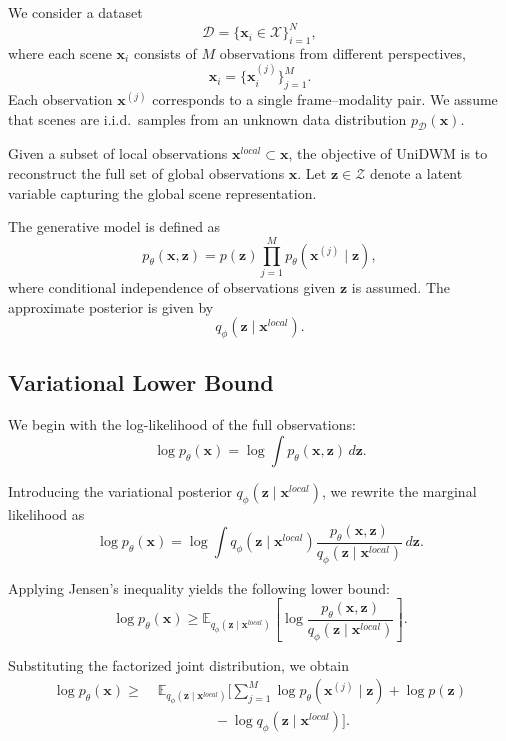 \documentclass{article}
\theoremstyle{plain}
\theoremstyle{definition}
\theoremstyle{remark}
\begin{document}
We consider a dataset
\[
\mathcal{D} = \{ \mathbf{x}_i \in \mathcal{X} \}_{i=1}^{N},
\]
where each scene $\mathbf{x}_i$ consists of $M$ observations from different perspectives,
\[
\mathbf{x}_i = \{ \boldsymbol{x}_i^{(j)} \}_{j=1}^{M}.
\]
Each observation $\boldsymbol{x}^{(j)}$ corresponds to a single frame--modality pair.
We assume that scenes are i.i.d.\ samples from an unknown data distribution
$p_{\mathcal{D}}(\mathbf{x})$.

Given a subset of local observations $\mathbf{x}^{local} \subset \mathbf{x}$,
the objective of UniDWM is to reconstruct the full set of global observations
$\mathbf{x}$.
Let $\mathbf{z} \in \mathcal{Z}$ denote a latent variable capturing the global
scene representation.

The generative model is defined as
\[
p_\theta(\mathbf{x}, \mathbf{z})
= p(\mathbf{z}) \prod_{j=1}^{M} p_\theta(\boldsymbol{x}^{(j)} \mid \mathbf{z}),
\]
where conditional independence of observations given $\mathbf{z}$ is assumed.
The approximate posterior is given by
\[
q_\phi(\mathbf{z} \mid \mathbf{x}^{local}).
\]

\subsection{Variational Lower Bound}

We begin with the log-likelihood of the full observations:
\[
\log p_\theta(\mathbf{x})
= \log \int p_\theta(\mathbf{x}, \mathbf{z})
\, d\mathbf{z}.
\]

Introducing the variational posterior $q_\phi(\mathbf{z} \mid \mathbf{x}^{local})$,
we rewrite the marginal likelihood as
\[
\log p_\theta(\mathbf{x})
= \log \int q_\phi(\mathbf{z} \mid \mathbf{x}^{local})
\frac{p_\theta(\mathbf{x}, \mathbf{z})}
     {q_\phi(\mathbf{z} \mid \mathbf{x}^{local})}
\, d\mathbf{z}.
\]

Applying Jensen's inequality yields the following lower bound:
\[
\log p_\theta(\mathbf{x})
\ge
\mathbb{E}_{q_\phi(\mathbf{z} \mid \mathbf{x}^{local})}
\left[
\log \frac{p_\theta(\mathbf{x}, \mathbf{z})}
           {q_\phi(\mathbf{z} \mid \mathbf{x}^{local})}
\right].
\]

Substituting the factorized joint distribution, we obtain
\[
\begin{aligned}
\log p_\theta(\mathbf{x})
\ge\;&
\mathbb{E}_{q_\phi(\mathbf{z} \mid \mathbf{x}^{local})}
\Bigg[
\sum_{j=1}^{M} \log p_\theta(\boldsymbol{x}^{(j)} \mid \mathbf{z})
+ \log p(\mathbf{z}) \\
&\qquad\qquad - \log q_\phi(\mathbf{z} \mid \mathbf{x}^{local})
\Bigg].
\end{aligned}
\]
\end{document}
